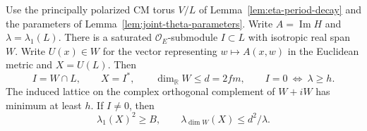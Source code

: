 \begin{auxlemma}
\label{lem:light-isotropic-periods}
Use the principally polarized CM torus \(V/L\) of
Lemma~\ref{lem:eta-period-decay} and the parameters of
Lemma~\ref{lem:joint-theta-parameters}. Write \(A=\operatorname{Im}H\)
and \(\lambda=\lambda_1(L)\). There is a saturated
\(\mathcal O_E\)-submodule \(I\subset L\) with isotropic real
span \(W\). Write \(U(x)\in W\) for the vector representing
\(w\mapsto A(x,w)\) in the Euclidean metric and \(X=U(L)\).
Then
\[
 I=W\cap L,\qquad X=I^*,\qquad \dim_{\mathbb R}W\le d=2fm,
 \qquad I=0\ \Longleftrightarrow\ \lambda\ge h .
\]
The induced lattice on the complex orthogonal complement of
\(W+iW\) has minimum at least \(h\). If \(I\ne0\), then
\begin{equation}\label{eq:light-dual-successive}
 \lambda_1(X)^2\ge B,\qquad
 \lambda_{\dim W}(X)\le d^2/\lambda .
\end{equation}
\end{auxlemma}
